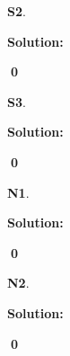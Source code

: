 \documentclass{article}
\newenvironment{problem}[1]
{
  \begin{flushleft}
  \textbf{#1}.
  \ignorespaces
}
{
  \end{flushleft}
}
\newenvironment{solution}
{
  \ignorespaces
  \textbf{Solution:}
}
{
  \ignorespacesafterend
  \begin{flushright}
  {\bfseries \qed}
  \end{flushright}
}
\begin{document}
\begin{problem}{S2}
\end{problem}
\begin{solution}
%
%
%
\end{solution}

\begin{problem}{S3}

\end{problem}
\begin{solution}

\end{solution}


\begin{problem}{N1}

\end{problem}
\begin{solution}

\end{solution}

\begin{problem}{N2}

\end{problem}
\begin{solution}

\end{solution}
\end{document}
